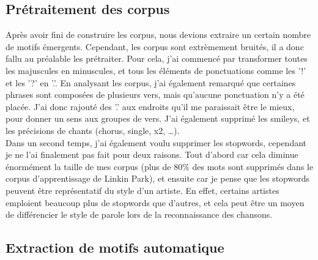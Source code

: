 \documentclass[a4paper]{article}
\begin{document}
	\subsection{Prétraitement des corpus}
	
	Après avoir fini de construire les corpus, nous devions extraire un certain nombre de motifs émergents. Cependant, les corpus sont extrèmement bruités, il a donc fallu au préalable les prétraiter. Pour cela, j'ai commencé par transformer toutes les majuscules en minuscules, et tous les éléments de ponctuations comme les '!' et les '?' en '.'. En analysant les corpus, j'ai également remarqué que certaines phrases sont composées de plusieurs vers, mais qu'aucune ponctuation n'y a été placée. J'ai donc rajouté des '.' aux endroits qu'il me paraissait être le mieux, pour donner un sens aux groupes de vers. J'ai également supprimé les smileys, et les précisions de chants (chorus, single, x2, \dots).\\
	
	Dans un second temps, j'ai également voulu supprimer les stopwords, cependant je ne l'ai finalement pas fait pour deux raisons. Tout d'abord car cela diminue énormément la taille de mes corpus (plus de 80\% des mots sont supprimés dans le corpus d'apprentissage de Linkin Park), et ensuite car je pense que les stopwords peuvent être représentatif du style d'un artiste. En effet, certains artistes emploient beaucoup plus de stopwords que d'autres, et cela peut être un moyen de différencier le style de parole lors de la reconnaissance des chansons.
	
	\subsection{Extraction de motifs automatique}
	
\end{document}
